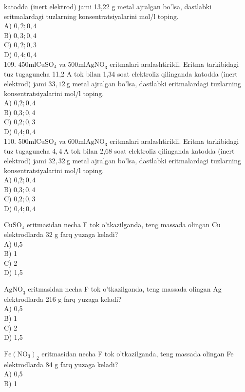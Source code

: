 katodda (inert elektrod) jami 13,22 g metal ajralgan bo'lsa, dastlabki eritmalardagi tuzlarning konsentratsiyalarini mol/l toping.\\
A) $0,2 ; 0,4$\\
B) $0,3 ; 0,4$\\
C) $0,2 ; 0,3$\\
D) $0,4 ; 0,4$\\
109. $450 \mathrm{ml} \mathrm{CuSO}_{4}$ va $500 \mathrm{ml} \mathrm{AgNO}_{3}$ eritmalari aralashtirildi. Eritma tarkibidagi tuz tugaguncha 11,2 A tok bilan 1,34 soat elektroliz qilinganda katodda (inert elektrod) jami $33,12 \mathrm{~g}$ metal ajralgan bo'lsa, dastlabki eritmalardagi tuzlarning konsentratsiyalarini mol/l toping.\\
A) 0,$2 ; 0,4$\\
B) 0,$3 ; 0,4$\\
C) 0,$2 ; 0,3$\\
D) 0,$4 ; 0,4$\\
110. $500 \mathrm{ml} \mathrm{CuSO}_{4}$ va $600 \mathrm{ml} \mathrm{AgNO}_{3}$ eritmalari aralashtirildi. Eritma tarkibidagi tuz tugaguncha $4,4 \mathrm{~A}$ tok bilan 2,68 soat elektroliz qilinganda katodda (inert elektrod) jami $32,32 \mathrm{~g}$ metal ajralgan bo'lsa, dastlabki eritmalardagi tuzlarning konsentratsiyalarini mol/l toping.\\
A) 0,$2 ; 0,4$\\
B) 0,$3 ; 0,4$\\
C) 0,$2 ; 0,3$\\
D) 0,$4 ; 0,4$
  \item $\mathrm{CuSO}_{4}$ eritmasidan necha F tok o'tkazilganda, teng massada olingan Cu elektrodlarda 32 g farq yuzaga keladi?\\
A) 0,5\\
B) 1\\
C) 2\\
D) 1,5
  \item $\mathrm{AgNO}_{3}$ eritmasidan necha F tok o'tkazilganda, teng massada olingan Ag elektrodlarda 216 g farq yuzaga keladi?\\
A) 0,5\\
B) 1\\
C) 2\\
D) 1,5
  \item $\mathrm{Fe}\left(\mathrm{NO}_{3}\right)_{2}$ eritmasidan necha F tok o'tkazilganda, teng massada olingan Fe elektrodlarda 84 g farq yuzaga keladi?\\
A) 0,5\\
B) 1\\
